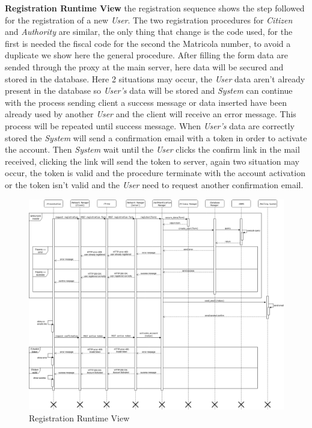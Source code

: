 \documentclass{article}
\begin{document}
\textbf{Registration Runtime View}  the registration sequence shows the step followed for the 
registration of a new \textit{User}. The two registration procedures for \textit{Citizen} and  
\textit{Authority} are similar, the only thing that change is the code used, for the first is 
needed the fiscal code for the second the Matricola number, to avoid a duplicate we show here 
the general procedure. After filling the form data are sended through the proxy at the main server, 
here data will be secured and stored in the database. Here 2 situations may occur, the \textit{User} 
data aren't already present in the database so \textit{User's} data will be stored and \textit{System} 
can continue with the process sending client a success message or data inserted have been already used 
by another \textit{User} and the client will receive an error message. This process will be repeated 
until success message. When \textit{User's} data are correctly stored the \textit{System} will send a 
confirmation email with a token in order to activate the account. Then \textit{System} wait until the 
\textit{User} clicks the confirm link in the mail received, clicking the link will send the token to 
server, again two situation may occur, the token is valid and the procedure terminate with the account 
activation or the token isn't valid and the \textit{User} need to request another confirmation email.

\begin{figure}[H]
    \centering
    \includegraphics[scale=0.4]{img/sequence_diagrams/registration_sequence.png}
    \caption{Registration Runtime View}
\end{figure}  
\end{document}
